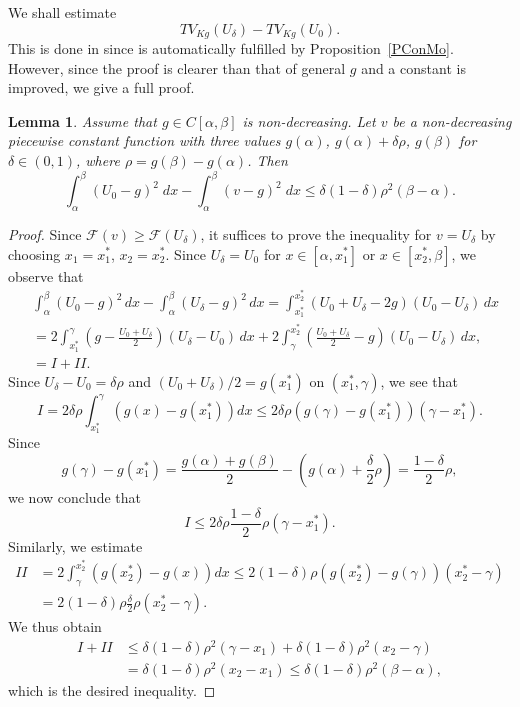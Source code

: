 \documentclass[12pt, reqno]{amsart}
\numberwithin{equation}{section}
\newtheorem{lemma}[thm]{Lemma}
\begin{document}
We shall estimate
\[
	TV_{Kg}(U_\delta) - TV_{Kg}(U_0).
\]
This is done in \cite[Lemma 4.7]{GKKOS} since \cite[(4.1)]{GKKOS} is automatically fulfilled by Proposition~\ref{PConMo}.
 However, since the proof is clearer than that of general $g$ and a constant is improved, we give a full proof.
\begin{lemma} \label{LFid}
Assume that $g\in C[\alpha,\beta]$ is non-decreasing.
 Let $v$ be a non-decreasing piecewise constant function with three values $g(\alpha)$, $g(\alpha)+\delta\rho$, $g(\beta)$ for $\delta\in(0,1)$, where $\rho=g(\beta)-g(\alpha)$.
 Then
\[
	\int_\alpha^\beta (U_0-g)^2\; dx - \int_\alpha^\beta(v-g)^2 \;d x
	\leq \delta(1-\delta)\rho^2 (\beta-\alpha).
\]
\end{lemma}
%
\begin{proof}
Since $\mathcal{F}(v)\ge\mathcal{F}(U_\delta)$, it suffices to prove the inequality for $v=U_\delta$ by choosing $x_1=x_1^*$, $x_2=x_2^*$.
 Since $U_\delta=U_0$ for $x\in[\alpha,x_1^*]$ or $x\in[x_2^*,\beta]$, we observe that
\begin{align*}
	&\int_\alpha^\beta (U_0-g)^2\, dx 
	- \int_\alpha^\beta (U_\delta-g)^2\, dx
	=\int_{x_1^*}^{x_2^*} (U_0 + U_\delta - 2g) (U_0-U_\delta)\, dx \\
	&=2 \int_{x_1^*}^\gamma \left( g - \frac{U_0+U_\delta}{2} \right) (U_\delta-U_0)\, dx
	+ 2 \int_\gamma^{x_2^*} \left( \frac{U_0+U_\delta}{2} - g \right) (U_0-U_\delta)\, dx, \\
	&= I + I\!I.
\end{align*}
Since $U_\delta-U_0=\delta\rho$ and $(U_0+U_\delta)/2=g(x_1^*)$ on $(x_1^*,\gamma)$, we see that
\[
	I = 2\delta\rho \int_{x_1^*}^\gamma \left( g(x) - g(x_1^*) \right) dx
	\le 2\delta\rho \left( g(\gamma) - g(x_1^*) \right) (\gamma-x_1^*).
\]
Since
\[
	g(\gamma) - g(x_1^*) 
	= \frac{g(\alpha) + g(\beta)}{2} - \left( g(\alpha) + \frac\delta2 \rho \right)
	=\frac{1-\delta}{2} \rho,
\]
we now conclude that
\[
	I \le 2 \delta\rho \frac{1-\delta}{2} \rho (\gamma-x_1^*).
\]
Similarly, we estimate
\begin{align*}
	I\!I &= 2 \int_\gamma^{x_2^*} \left( g(x_2^*)-g(x)\right) dx
	\le 2(1-\delta)\rho \left( g(x_2^*)-g(\gamma)\right) (x_2^*-\gamma) \\
	&= 2(1-\delta) \rho \frac\delta2 \rho (x_2^*-\gamma).
\end{align*}
We thus obtain
\begin{align*}
	I + I\!I &\le \delta(1-\delta)\rho^2 (\gamma-x_1)
	+ \delta(1-\delta) \rho^2 (x_2-\gamma) \\
	&= \delta(1-\delta)\rho^2 (x_2 - x_1)
	\le \delta(1-\delta) \rho^2 (\beta-\alpha),
\end{align*}
which is the desired inequality.
\end{proof}
\end{document}

